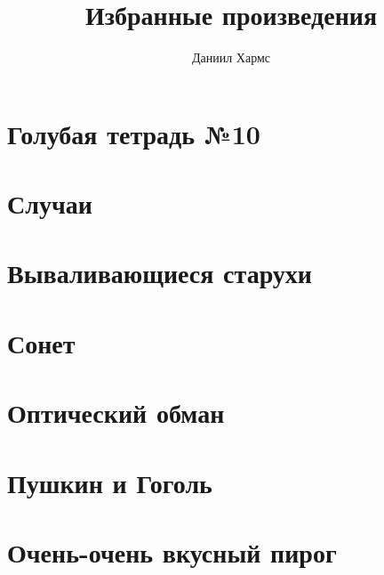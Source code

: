 \documentclass[a4paper,12pt]{book}
\title{Избранные произведения}
\author{Даниил Хармс}
\date{}
\begin{document}
\maketitle

\chapter{Голубая тетрадь №10}


\chapter{Случаи}


\chapter{Вываливающиеся старухи}


\chapter{Сонет}


\chapter{Оптический обман}


\chapter{Пушкин и Гоголь}


\chapter{Очень-очень вкусный пирог}

\end{document}

